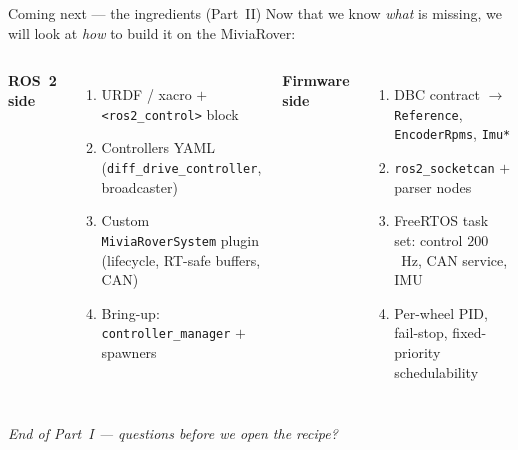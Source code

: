 \begin{frame}{Coming next — the ingredients (Part~II)}
  Now that we know \emph{what} is missing, we will look at \emph{how} to
  build it on the MiviaRover:
  \vspace{0.6em}

  \begin{columns}[T,onlytextwidth]
      \textbf{ROS~2 side}
      \begin{enumerate}\setlength\itemsep{2pt}
        \item URDF / xacro \(+\) \texttt{<ros2\_control>} block
        \item Controllers YAML\\
              (\texttt{diff\_drive\_controller}, broadcaster)
        \item Custom \texttt{MiviaRoverSystem} plugin\\
              (lifecycle, RT-safe buffers, CAN)
        \item Bring-up: \texttt{controller\_manager} \(+\) spawners
      \end{enumerate}

      \textbf{Firmware side}
      \begin{enumerate}\setlength\itemsep{2pt}
        \item DBC contract \(\rightarrow\) \texttt{Reference},
              \texttt{EncoderRpms}, \texttt{Imu*}
        \item \texttt{ros2\_socketcan} \(+\) parser nodes
        \item FreeRTOS task set: control \(200\)~Hz, CAN service, IMU
        \item Per-wheel PID, fail-stop, fixed-priority schedulability
      \end{enumerate}
  \end{columns}

  \vspace{1.0em}
  \centering
  \alert{\textit{End of Part~I — questions before we open the recipe?}}
\end{frame}
